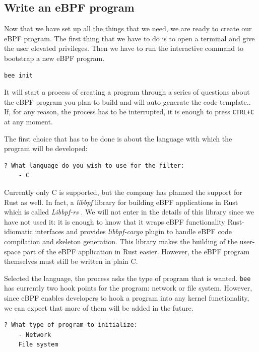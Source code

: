 \subsection{Write an eBPF program}

Now that we have set up all the things that we need, we are ready to create our eBPF program.
The first thing that we have to do is to open a terminal and give the user elevated privileges.
Then we have to run the interactive command to bootstrap a new eBPF program.

\begin{lstlisting}[language=bash, caption={bee init command}]
	bee init
\end{lstlisting}

It will start a process of creating a program through a series of questions about the eBPF program you plan to build and will auto-generate the code template..
If, for any reason, the process has to be interrupted, it is enough to press \verb|CTRL+C| at any moment.

The first choice that has to be done is about the language with which the program will be developed:

\begin{lstlisting}[language=bash, caption={bee language selection}]
	? What language do you wish to use for the filter: 
	- C
\end{lstlisting}

Currently only C is supported, but the company has planned the support for Rust as well.
In fact, a \textit{libbpf} library for building eBPF applications in Rust which is called \textit{Libbpf-rs} \cite{libbpfRustGithubRepo}.
We will not enter in the details of this library since we have not used it: it is enough to know that it wraps eBPF functionality Rust-idiomatic interfaces and provides \textit{libbpf-cargo} plugin to handle eBPF code compilation and skeleton generation.
This library makes the building of the user-space part of the eBPF application in Rust easier.
However, the eBPF program themselves must still be written in plain C.

Selected the language, the process asks the type of program that is wanted.
\verb|bee| has currently two hook points for the program: network or file system.
However, since eBPF enables developers to hook a program into any kernel functionality, we can expect that more of them will be added in the future.

\begin{lstlisting}[language=bash, caption={bee type of program selection}]
	? What type of program to initialize: 
	- Network
	File system
\end{lstlisting}

